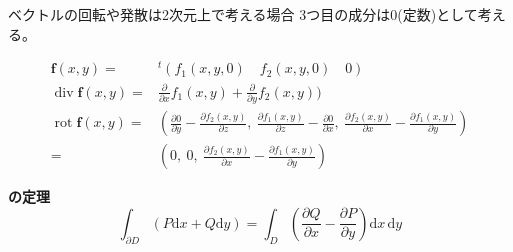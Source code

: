 \documentclass[12pt,b5paper]{ltjsarticle}
\newcommand{\Rot}{\mathop{\mathrm{rot}}\nolimits}
\newcommand{\Div}{\mathop{\mathrm{div}}\nolimits}
\begin{document}
%
%

\dotfill

ベクトルの回転や発散は2次元上で考える場合
3つ目の成分は0(定数)として考える。

\begin{align}
 \bm{f}(x,y) =& {}^{t}(f_1(x,y,0) \quad f_2(x,y,0) \quad 0)\\
 \Div \bm{f}(x,y) =& \frac{\partial}{\partial x}f_1(x,y) + \frac{\partial}{\partial y}f_2(x,y))\\
 \Rot \bm{f}(x,y)
  =& \left(
     \frac{\partial 0}{\partial y} - \frac{\partial f_2(x,y)}{\partial z},\
     \frac{\partial f_1(x,y)}{\partial z} - \frac{\partial 0}{\partial x},\
     \frac{\partial f_2(x,y)}{\partial x} - \frac{\partial f_1(x,y)}{\partial y}
    \right)\\
  =& \left(
     0,\
     0,\
     \frac{\partial f_2(x,y)}{\partial x} - \frac{\partial f_1(x,y)}{\partial y}
    \right)
\end{align}

\dotfill

\textbf{の定理}
\begin{equation}
 \int_{\partial D} \left( P\mathrm{d}x + Q\mathrm{d}y \right)
  =\int_{D} \left( \frac{\partial Q}{\partial x} - \frac{\partial P}{\partial y}\right)\mathrm{d}x\,\mathrm{d}y
\end{equation}
\end{document}
